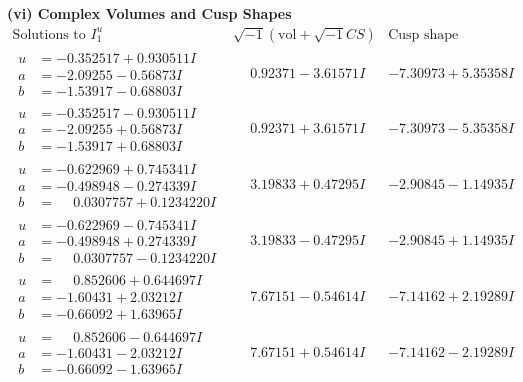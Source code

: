 \documentclass[1p]{elsarticle_modified}
\theoremstyle{definition}
\newcommand{\I}{\sqrt{-1}}
\begin{document}
\newpage\flushleft \textbf{(vi) Complex Volumes and Cusp Shapes}
$$\begin{array}{c|c|c}  
\text{Solutions to }I^u_{1}& \I (\text{vol} + \sqrt{-1}CS) & \text{Cusp shape}\\
 \hline 
\begin{aligned}
u &= -0.352517 + 0.930511 I \\
a &= -2.09255 - 0.56873 I \\
b &= -1.53917 - 0.68803 I\end{aligned}
 & \phantom{-}0.92371 - 3.61571 I & -7.30973 + 5.35358 I \\ \hline\begin{aligned}
u &= -0.352517 - 0.930511 I \\
a &= -2.09255 + 0.56873 I \\
b &= -1.53917 + 0.68803 I\end{aligned}
 & \phantom{-}0.92371 + 3.61571 I & -7.30973 - 5.35358 I \\ \hline\begin{aligned}
u &= -0.622969 + 0.745341 I \\
a &= -0.498948 - 0.274339 I \\
b &= \phantom{-}0.0307757 + 0.1234220 I\end{aligned}
 & \phantom{-}3.19833 + 0.47295 I & -2.90845 - 1.14935 I \\ \hline\begin{aligned}
u &= -0.622969 - 0.745341 I \\
a &= -0.498948 + 0.274339 I \\
b &= \phantom{-}0.0307757 - 0.1234220 I\end{aligned}
 & \phantom{-}3.19833 - 0.47295 I & -2.90845 + 1.14935 I \\ \hline\begin{aligned}
u &= \phantom{-}0.852606 + 0.644697 I \\
a &= -1.60431 + 2.03212 I \\
b &= -0.66092 + 1.63965 I\end{aligned}
 & \phantom{-}7.67151 - 0.54614 I & -7.14162 + 2.19289 I \\ \hline\begin{aligned}
u &= \phantom{-}0.852606 - 0.644697 I \\
a &= -1.60431 - 2.03212 I \\
b &= -0.66092 - 1.63965 I\end{aligned}
 & \phantom{-}7.67151 + 0.54614 I & -7.14162 - 2.19289 I \\ \hline\begin{aligned}

\end{aligned}
\end{array}$$
\end{document}
